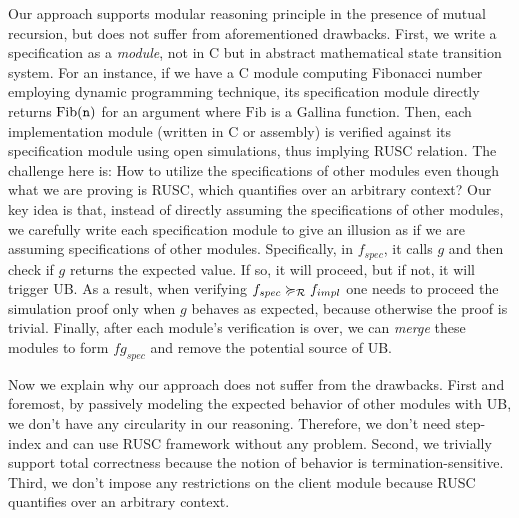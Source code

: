 Our approach supports modular reasoning principle in the presence of mutual recursion, but does not suffer from aforementioned drawbacks.
First, we write a specification as a {\it module}, not in C but in abstract mathematical state transition system. %
For an instance, if we have a C module computing Fibonacci number employing dynamic programming technique, its specification module directly returns $\mathrm{Fib}(\texttt{n})$ for an argument  where $\mathrm{Fib}$ is a Gallina function.
Then, each implementation module (written in C or assembly) is verified against its specification module using open simulations, thus implying RUSC relation.
The challenge here is: How to utilize the specifications of other modules even though what we are proving is RUSC, which quantifies over an arbitrary context?
Our key idea is that, instead of directly assuming the specifications of other modules, we carefully write each specification module to give an illusion as if we are assuming specifications of other modules.
Specifically, in $f_{spec}$, it calls $g$ and then check if $g$ returns the expected value. If so, it will proceed, but if not, it will trigger UB.
As a result, when verifying $f_{spec} \succcurlyeq_{\mathcal{R}} f_{impl}$ one needs to proceed the simulation proof only when $g$ behaves as expected, because otherwise the proof is trivial.
Finally, after each module's verification is over, we can {\it merge} these modules to form $fg_{spec}$ and remove the potential source of UB.


\noindent Now we explain why our approach does not suffer from the drawbacks.
First and foremost, by passively modeling the expected behavior of other modules with UB, we don't have any circularity in our reasoning. Therefore, we don't need step-index and can use RUSC framework without any problem.
Second, we trivially support total correctness because the notion of behavior is termination-sensitive.
Third, we don't impose any restrictions on the client module because RUSC quantifies over an arbitrary context.



















